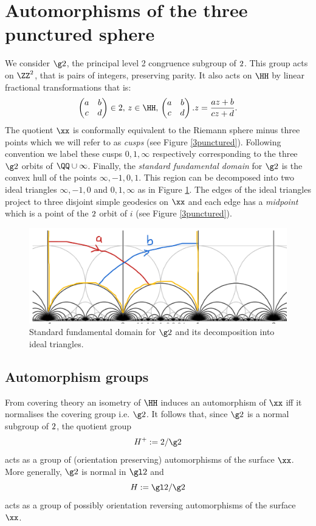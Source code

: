 \section{Automorphisms of the three punctured sphere}


We consider $\g2$,
the principal level 2 congruence subgroup of $\sl2$.
This group acts on $\ZZ^2$, that is pairs of integers,  preserving parity.
It also acts on $\HH$ by linear fractional transformations
that is:
$$\begin{pmatrix}
a & b \\
c & d
\end{pmatrix} \in \sl2,\, z\in \HH,\, 
\begin{pmatrix}
a & b \\
c & d
\end{pmatrix}. z = \frac{az + b}{cz + d}.
$$
The quotient $\xx$ is conformally equivalent to the Riemann  sphere minus three points
which we will refer to as \textit{cusps}
(see Figure \ref{3punctured}). 
Following  convention we label these cusps $0,1,\infty$ respectively
corresponding to the three $\g2$ orbits of $\QQ \cup \infty$. 
Finally, the \textit{standard fundamental domain}  for $\g2$ 
is the convex hull of the points $\infty, -1, 0 , 1$.
This region can be decomposed into two ideal triangles 
$\infty, -1, 0 $ and $ 0 , 1,\infty$ as in Figure \ref{fund}.
The edges of the ideal triangles project to three disjoint simple geodesics on $\xx$
and each edge has a \textit{midpoint} 
which is a point of the $\sl2$ orbit of $i$ (see Figure \ref{3punctured}).

 \begin{figure}[hb]
\begin{center}
\includegraphics[scale=.5]{fund_dom.png} 
\end{center}
\caption{Standard fundamental domain for $\g2$ and its decomposition into ideal triangles.}
\label{fund}
\end{figure}


\subsection{Automorphism groups}
From covering theory an isometry  of $\HH$ 
induces an automorphism of $\xx$ iff it normalises the covering group
i.e. $\g2$.
It follows that,
since $\g2$ is a normal subgroup of $\sl2$,
 the quotient group
$$H^+: = \sl2/\g2$$
acts as a group of (orientation preserving) automorphisms of the surface $\xx$.
More generally, $\g2$ is normal in $\gl2$ and 
$$H: = \gl2/\g2$$
acts as a group of possibly orientation reversing  automorphisms of the surface $\xx$.


